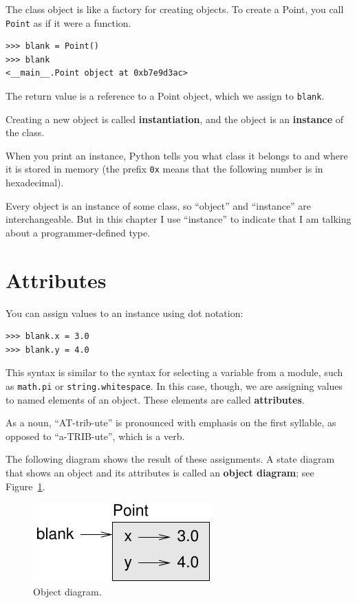 \documentclass[10pt]{book}
\begin{document}
The class object is like a factory for creating objects.  To create a
Point, you call {\tt Point} as if it were a function.

\begin{verbatim}
>>> blank = Point()
>>> blank
<__main__.Point object at 0xb7e9d3ac>
\end{verbatim}
%
The return value is a reference to a Point object, which we
assign to {\tt blank}.  

Creating a new object is called
{\bf instantiation}, and the object is an {\bf instance} of
the class.

When you print an instance, Python tells you what class it
belongs to and where it is stored in memory (the prefix
{\tt 0x} means that the following number is in hexadecimal).

Every object is an instance of some class, so ``object'' and
``instance'' are interchangeable.  But in this chapter I use
``instance'' to indicate that I am talking about a programmer-defined
type.


\section{Attributes}
\label{attributes}

You can assign values to an instance using dot notation:

\begin{verbatim}
>>> blank.x = 3.0
>>> blank.y = 4.0
\end{verbatim}
%
This syntax is similar to the syntax for selecting a variable from a
module, such as {\tt math.pi} or {\tt string.whitespace}.  In this case,
though, we are assigning values to named elements of an object.
These elements are called {\bf attributes}.

As a noun, ``AT-trib-ute'' is pronounced with emphasis on the first
syllable, as opposed to ``a-TRIB-ute'', which is a verb.

The following diagram shows the result of these assignments.
A state diagram that shows an object and its attributes is
called an {\bf object diagram}; see Figure~\ref{fig.point}.

\begin{figure}
\centerline
{\includegraphics[scale=0.8]{figs/point.pdf}}
\caption{Object diagram.}
\label{fig.point}
\end{figure}
\end{document}
